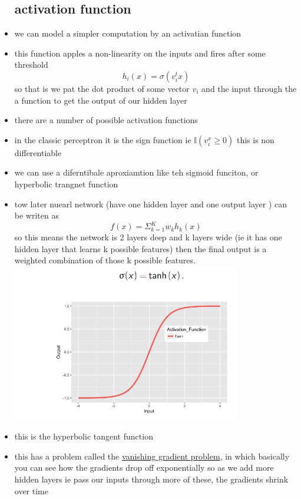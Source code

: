 \documentclass{article}
\begin{document}
\begin{itemize}
\subsection{activation function}
\item we can model a simpler computation by an activatian function 
\item this function apples a non-linearity on the inputs and fires after some threshold 
$$h_i(x)=\sigma(v_i^tx)$$ so that is we pat the dot product of some vector $v_i$ and the input through the a function to get the output of our hidden layer 
\item there are a number of possible activation functions 
\item in the classic perceptron it is the sign function ie $\mathbb{I}(v_i^x\geq 0)$ this is non differentiable
\item we can use a diferntibale aproxiamtion like teh sigmoid funciton, or hyperbolic trangnet function 
\item tow later nuearl network (have one hidden layer and one output layer ) can be writen as $$f(x)=\Sigma_{k=1}^{K}w_{k}h_{k}(x)$$ so this means the network is 2 layers deep and k layers wide (ie it has one hidden layer that learns k possible features) then the final output is a weighted combination of those k possible features.  \\
\includegraphics[width=10cm]{lecture_notes/lecture_11/immages/l11_5.jpg}
\item this is the hyperbolic tangent function 
\item this has a problem called the \href{https://en.wikipedia.org/wiki/Vanishing_gradient_problem}{vanishing gradient problem}, in which basically you can see how the gradients drop off exponentially so as we add more hidden layers ie pass our inputs through more of these, the gradients shrink over time 


\end{itemize}
\end{document}
